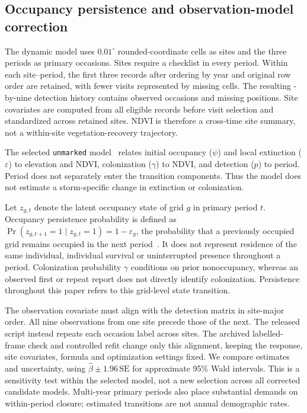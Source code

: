 \subsection{Occupancy persistence and observation-model correction}
\label{sec:ordering}
The dynamic model uses $0.01^\circ$ rounded-coordinate cells as sites and the three periods as primary occasions. Sites require a checklist in every period. Within each site--period, the first three records after ordering by year and original row order are retained, with fewer visits represented by missing cells. The resulting \nOccSites{}-by-nine detection history contains \nOccasions{} observed occasions and \nOccMissing{} missing positions. Site covariates are computed from all eligible records before visit selection and standardized across retained sites. NDVI is therefore a cross-time site summary, not a within-site vegetation-recovery trajectory.

The selected \texttt{unmarked} model~\cite{fiske2011} relates initial occupancy ($\psi$) and local extinction ($\varepsilon$) to elevation and NDVI, colonization ($\gamma$) to NDVI, and detection ($p$) to period. Period does not separately enter the transition components. Thus the model does not estimate a storm-specific change in extinction or colonization.

Let $z_{g,t}$ denote the latent occupancy state of grid $g$ in primary period $t$. Occupancy persistence probability is defined as $\Pr(z_{g,t+1}=1\mid z_{g,t}=1)=1-\varepsilon_g$, the probability that a previously occupied grid remains occupied in the next period~\cite{mackenzie2003}. It does not represent residence of the same individual, individual survival or uninterrupted presence throughout a period. Colonization probability $\gamma$ conditions on prior nonoccupancy, whereas an observed first or repeat report does not directly identify colonization. Persistence throughout this paper refers to this grid-level state transition.

The observation covariate must align with the detection matrix in site-major order. All nine observations from one site precede those of the next. The released script instead repeats each occasion label across sites. The archived labelled-frame check and controlled refit change only this alignment, keeping the response, site covariates, formula and optimization settings fixed. We compare estimates and uncertainty, using $\widehat\beta\pm1.96\,\mathrm{SE}$ for approximate 95\% Wald intervals. This is a sensitivity test within the selected model, not a new selection across all corrected candidate models. Multi-year primary periods also place substantial demands on within-period closure; estimated transitions are not annual demographic rates.

